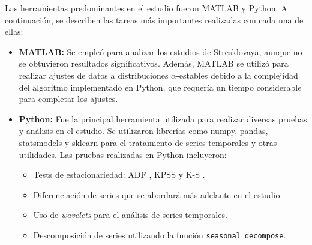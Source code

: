 Las herramientas predominantes en el estudio fueron MATLAB y Python. A continuación, se describen las tareas más importantes realizadas con cada una de ellas:

\begin{itemize}
\item \textbf{MATLAB:} Se empleó para analizar los estudios de Stresklovaya, aunque no se obtuvieron resultados significativos. Además, MATLAB se utilizó para realizar ajustes de datos a distribuciones $\alpha$-estables debido a la complejidad del algoritmo implementado en Python, que requería un tiempo considerable para completar los ajustes.
\item \textbf{Python:} Fue la principal herramienta utilizada para realizar diversas pruebas y análisis en el estudio. Se utilizaron librerías como numpy, pandas, statsmodels y sklearn para el tratamiento de series temporales y otras utilidades. Las pruebas realizadas en Python incluyeron:
\begin{itemize}
    \item Tests de estacionariedad: \ac{ADF} \cite{dickey1979distribution}, \ac{KPSS} \cite{kwiatkowski1992testing} y \ac{K-S} \cite{kolmogorov1933sulla}.
    \item Diferenciación de series que se abordará más adelante en el estudio.
    \item Uso de \textit{wavelets} para el análisis de series temporales.
    \item Descomposición de series utilizando la función \texttt{seasonal\_decompose}.
\end{itemize}
\end{itemize}

